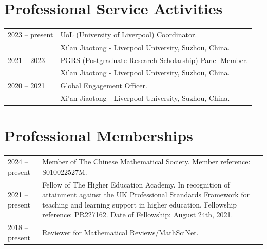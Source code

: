 \documentclass[a4paper,12pt]{article}
\begin{document}
\section*{\Large{Professional Service Activities}}
\begin{tabular}{@{}p{1.4in}p{4in}} 
2023 -- present & UoL (University of Liverpool) Coordinator. \\
                           & Xi'an Jiaotong - Liverpool University, Suzhou, China.  \\
2021 -- 2023 & PGRS (Postgraduate Research Scholarship) Panel Member. \\
                           & Xi'an Jiaotong - Liverpool University, Suzhou, China.  \\
2020 -- 2021 & Global Engagement Officer. \\
             & Xi'an Jiaotong - Liverpool University, Suzhou, China.                  
\end{tabular}

\section*{\Large{Professional Memberships}}
\begin{tabular}{@{}p{1.4in}p{4in}} 
2024 -- present &  Member of The Chinese Mathematical Society.  Member reference: S010022527M. \\
2021 -- present & Fellow of The Higher Education Academy. 
In recognition of attainment against the UK
Professional Standards Framework for teaching and learning support in higher education.
Fellowship reference: PR227162. Date of Fellowship: August 24th, 2021. \\
2018 -- present &  Reviewer for Mathematical Reviews/MathSciNet.            
\end{tabular}
\end{document}
